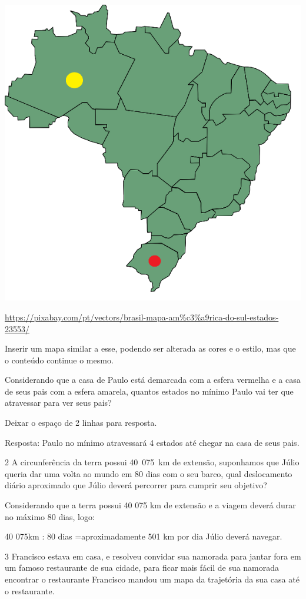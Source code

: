 \includegraphics[width=2\times 73952in,height=2\times 725in]{./imgSAEB_8_MAT/media/image36.png}

\url{https://pixabay.com/pt/vectors/brasil-mapa-am\%c3\%a9rica-do-sul-estados-23553/}

Inserir um mapa similar a esse, podendo ser alterada as cores e o
estilo, mas que o conteúdo continue o mesmo.

Considerando que a casa de Paulo está demarcada com a esfera vermelha e
a casa de seus pais com a esfera amarela, quantos estados no mínimo
Paulo vai ter que atravessar para ver seus pais?

Deixar o espaço de 2 linhas para resposta.

Resposta: Paulo no mínimo atravessará 4 estados até chegar na casa de
seus pais.

\num{2} A circunferência da terra possui 40~075~km de extensão, suponhamos
que Júlio queria dar uma volta ao mundo em 80 dias com o seu barco, qual
deslocamento diário aproximado que Júlio deverá percorrer para cumprir
seu objetivo?

Considerando que a terra possui 40 075 km de extensão e a viagem deverá
durar no máximo 80 dias, logo:

40 075km : 80 dias =aproximadamente 501 km por dia Júlio deverá navegar.

\num{3} Francisco estava em casa, e resolveu convidar sua namorada para
jantar fora em um famoso restaurante de sua cidade, para ficar mais
fácil de sua namorada encontrar o restaurante Francisco mandou um mapa
da trajetória da sua casa até o restaurante.


